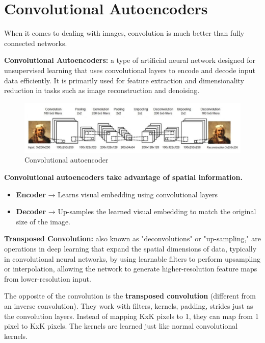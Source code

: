 \section{Convolutional Autoencoders}

\begin{idea}
    When it comes to dealing with images, convolution is much better than fully connected networks.
\end{idea}

\begin{definition}
   \textbf{Convolutional Autoencoders:} a type of artificial neural network designed for unsupervised learning that uses convolutional layers to encode and decode input data efficiently. It is primarily used for feature extraction and dimensionality reduction in tasks such as image reconstruction and denoising.
\end{definition}

\begin{figure}[h!t]
    \centering
    \includegraphics[width=0.75\linewidth]{convautoencoder.png}
    \caption{Convolutional autoencoder}
    \label{fig:enter-label}
\end{figure}

\textbf{Convolutional autoencoders take advantage of spatial information.}
\begin{itemize}
    \item \textbf{Encoder} → Learns visual embedding using convolutional layers
    \item \textbf{Decoder} → Up-samples the learned visual embedding to match the original size of the image.
\end{itemize}

\begin{definition}
    \textbf{Transposed Convolution:} also known as "deconvolutions" or "up-sampling," are operations in deep learning that expand the spatial dimensions of data, typically in convolutional neural networks, by using learnable filters to perform upsampling or interpolation, allowing the network to generate higher-resolution feature maps from lower-resolution input.
\end{definition}

The opposite of the convolution is the\textbf{ transposed convolution} (different from an
inverse convolution). They work with filters, kernels, padding, strides just as the convolution layers. Instead of mapping KxK pixels to 1, they can map from 1 pixel to KxK pixels. The kernels are learned just like normal convolutional kernels.


